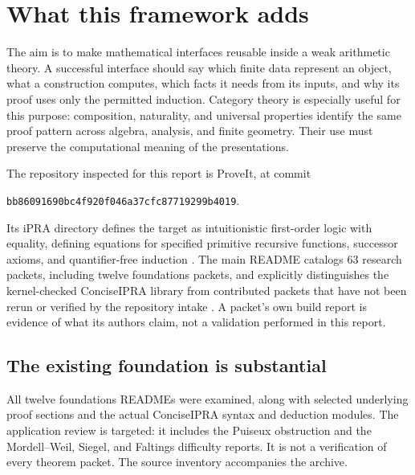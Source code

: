 \section{What this framework adds}
\label{sec:scope}

The aim is to make mathematical interfaces reusable inside a weak arithmetic
theory. A successful interface should say which finite data represent an object,
what a construction computes, which facts it needs from its inputs, and why
its proof uses only the permitted induction. Category theory is especially
useful for this purpose: composition, naturality, and universal properties
identify the same proof pattern across algebra, analysis, and finite geometry.
Their use must preserve the computational meaning of the presentations.

The repository inspected for this report is ProveIt, at commit
\begin{center}
\small\texttt{bb86091690bc4f920f046a37cfc87719299b4019}.
\end{center}
Its iPRA directory defines
the target as intuitionistic first-order logic with equality, defining equations
for specified primitive recursive functions, successor axioms, and
quantifier-free induction \cite{repo-main,repo-pr}. The main README catalogs
63 research packets, including twelve foundations packets, and explicitly
distinguishes the kernel-checked ConciseIPRA library from contributed packets
that have not been rerun or verified by the repository intake
\cite{repo-index}. A packet's own build report is evidence of what its authors
claim, not a validation performed in this report.

\subsection{The existing foundation is substantial}

All twelve foundations READMEs were examined, along with selected underlying
proof sections and the actual ConciseIPRA syntax and deduction modules. The
application review is targeted: it includes the Puiseux obstruction and the
Mordell--Weil, Siegel, and Faltings difficulty reports. It is not a verification
of every theorem packet. The source inventory accompanies the archive.


